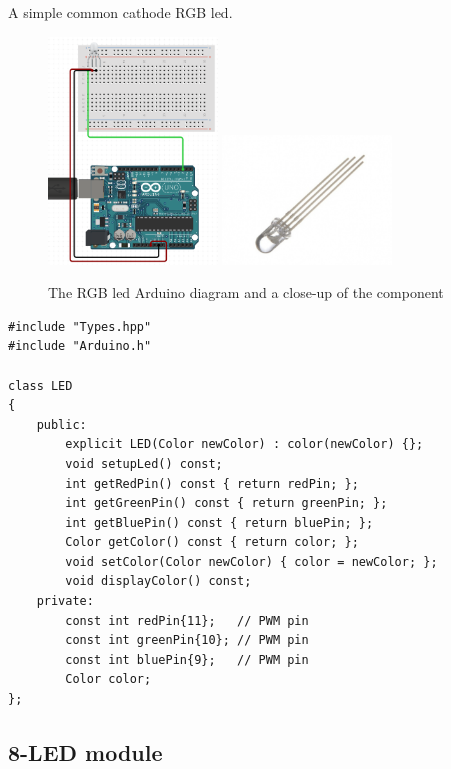 \documentclass[12pt]{article}
\begin{document}
	A simple common cathode RGB led.
	
	\begin{figure}[ht]
		\centering
		\includegraphics[width=0.4\textwidth]{diag_led.png}
		\includegraphics[width=0.4\textwidth]{led.png}
		\caption{The RGB led Arduino diagram and a close-up of the component}
		\label{fig:rgb_led}
	\end{figure}
	
	\begin{lstlisting}[caption = C++ class definition of the RGB LED module]
#include "Types.hpp"
#include "Arduino.h"

class LED
{
	public:
		explicit LED(Color newColor) : color(newColor) {};
		void setupLed() const;
		int getRedPin() const { return redPin; };
		int getGreenPin() const { return greenPin; };
		int getBluePin() const { return bluePin; };
		Color getColor() const { return color; };
		void setColor(Color newColor) { color = newColor; };
		void displayColor() const;
	private:
		const int redPin{11};   // PWM pin
		const int greenPin{10}; // PWM pin
		const int bluePin{9};   // PWM pin
		Color color;
};
	\end{lstlisting}
	
	\clearpage
	
	\subsection{8-LED module}
	
\end{document}
